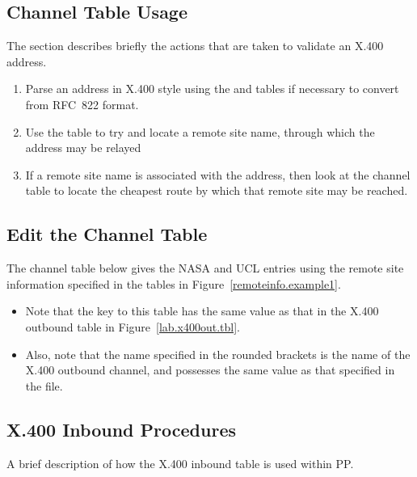
\subsection{Channel Table Usage}
The section describes briefly the actions that are taken to validate
an X.400 address.

\begin{enumerate}
\item Parse an address in X.400 style using the  and 
 tables if necessary to convert from RFC~822 format.

\item Use the  table to try and locate a remote site 
name, through which the address may be relayed 

\item If a remote site name is associated with the address, then 
look at the channel table to locate the cheapest route by which that
remote site may be reached.
\end{enumerate}


\subsection{Edit the Channel Table} 

The channel table below gives the NASA and UCL entries using the
remote site information specified in the tables in
Figure~\ref{remoteinfo.example1}.

\begin{itemize}
\item Note  that the key to this table has the same value as that in
the X.400 outbound table in Figure~\ref{lab.x400out.tbl}.

\item Also, note that the name specified in the rounded brackets is the 
name of the X.400 outbound channel, and possesses the same value as
that specified in the  file.
\end{itemize}


\subsection{X.400 Inbound Procedures}

A brief description of how the X.400 inbound table is used within PP.

